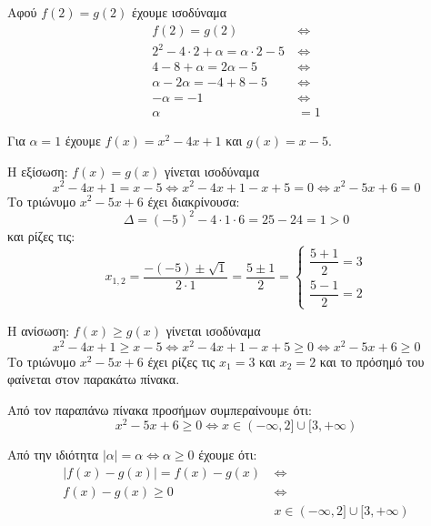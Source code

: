
\begin{alist}
\item Αφού $f(2) = g(2)$ έχουμε ισοδύναμα
\begin{align*}
f(2) = g(2) \ &\Leftrightarrow \\
2^2 - 4 \cdot 2 + \alpha = \alpha \cdot 2 - 5 \ &\Leftrightarrow \\
4 - 8 + \alpha = 2\alpha - 5 \ &\Leftrightarrow \\
\alpha - 2\alpha = -4 + 8 - 5 \ &\Leftrightarrow \\
-\alpha = -1 \ &\Leftrightarrow \\
\alpha &= 1
\end{align*}

\item Για $\alpha = 1$ έχουμε $f(x) = x^2 - 4x + 1$ και $g(x) = x - 5$.
\begin{rlist}
\item Η εξίσωση: $f(x) = g(x)$ γίνεται ισοδύναμα
\[x^2 - 4x + 1 = x - 5 \Leftrightarrow x^2 - 4x + 1 - x + 5 = 0 \Leftrightarrow x^2 - 5x + 6 = 0\]
Το τριώνυμο $x^2 - 5x + 6$ έχει διακρίνουσα:
\[\Delta = (-5)^2 - 4 \cdot 1 \cdot 6 = 25 - 24 = 1 > 0\]
και ρίζες τις:
\[x_{1,2} = \dfrac{-(-5) \pm \sqrt{1}}{2 \cdot 1} = \dfrac{5 \pm 1}{2} = \begin{cases} \dfrac{5 + 1}{2} = 3 \\ \dfrac{5 - 1}{2} = 2 \end{cases}\]

\item Η ανίσωση: $f(x) \ge g(x)$ γίνεται ισοδύναμα
\[x^2 - 4x + 1 \ge x - 5 \Leftrightarrow x^2 - 4x + 1 - x + 5 \ge 0 \Leftrightarrow x^2 - 5x + 6 \ge 0\]
Το τριώνυμο $x^2 - 5x + 6$ έχει ρίζες τις $x_1 = 3$ και $x_2 = 2$ και το πρόσημό του φαίνεται στον παρακάτω πίνακα.

\begin{center}
\end{center}

Από τον παραπάνω πίνακα προσήμων συμπεραίνουμε ότι:
\[x^2 - 5x + 6 \ge 0 \Leftrightarrow x \in (-\infty, 2] \cup [3, +\infty)\]

Από την ιδιότητα $|\alpha| = \alpha \Leftrightarrow \alpha \ge 0$ έχουμε ότι:
\begin{align*}
|f(x) - g(x)| = f(x) - g(x) \ &\Leftrightarrow \\
f(x) - g(x) \ge 0 \ &\Leftrightarrow \\
&x \in (-\infty, 2] \cup [3, +\infty)
\end{align*}
\end{rlist}
\end{alist}

